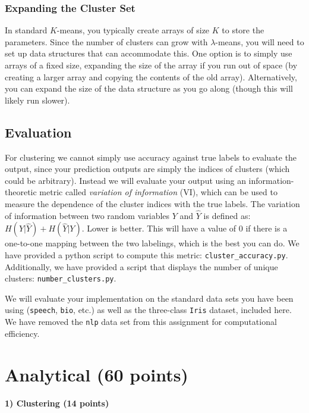 \documentclass[11pt]{article}
\newcommand{\code}[1]{{\footnotesize \tt #1}}
\begin{document}
\subsubsection{Expanding the Cluster Set}
In standard $K$-means, you typically create arrays of size $K$ to store the parameters. Since the number of clusters can grow with $\lambda$-means, you will need to set up data structures that can accommodate this.
One option is to simply use arrays of a fixed size, expanding the size of the array if you run out of space (by creating a larger array and copying the contents of the old array). Alternatively, you can expand the size of the data structure as you go along (though this will likely run slower).


\subsection{Evaluation}
\label{sec:evaluation}

For clustering we cannot simply use accuracy against true labels to evaluate the output, since your prediction outputs are simply the indices of clusters (which could be arbitrary).  Instead we will evaluate your output using an information-theoretic metric called {\em variation of information} (VI), which can be used to measure the dependence of the cluster indices with the true labels.
The variation of information between two random variables $Y$ and $\hat{Y}$ is defined as: $H(Y|\hat{Y}) + H(\hat{Y}|Y)$. Lower is better. This will have a value of 0 if there is a one-to-one mapping between the two labelings, which is the best you can do.
We have provided a python script to compute this metric: \code{cluster\_accuracy.py}.  Additionally, we have provided a script that displays the number of unique clusters: \code{number\_clusters.py}.

We will evaluate your implementation on the standard data sets you have been using (\code{speech}, \code{bio}, etc.) as well as the three-class \code{Iris} dataset, included here.  We have removed the \code{nlp} data set from this assignment for computational efficiency.	
	
\section{Analytical (60 points)}
	
\paragraph{1) Clustering (14 points)}
	
\end{document}
